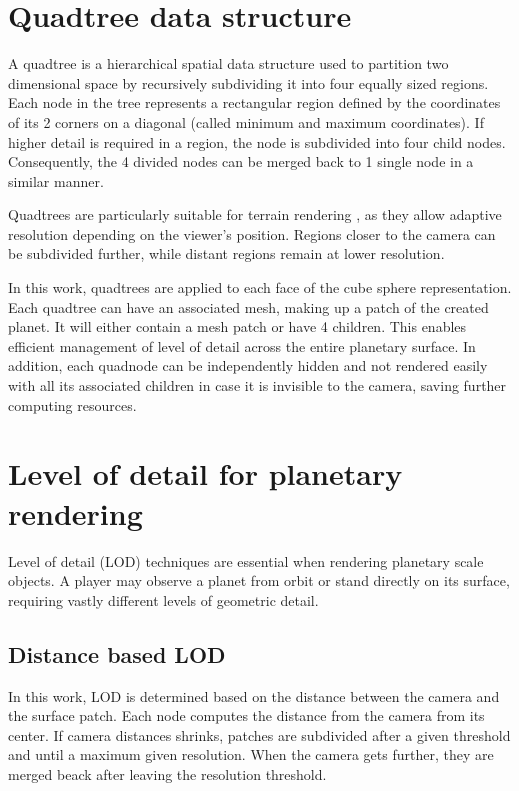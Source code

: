 \documentclass[12pt]{report}
\begin{document}
\section{Quadtree data structure}

A quadtree is a hierarchical spatial data structure \cite{wu2010, zechmann2025} used to partition two dimensional space by recursively subdividing it into four equally sized regions. Each node in the tree represents a rectangular region defined by the coordinates of its 2 corners on a diagonal (called minimum and maximum coordinates). If higher detail is required in a region, the node is subdivided into four child nodes. Consequently, the 4 divided nodes can be merged back to 1 single node in a similar manner.

Quadtrees are particularly suitable for terrain rendering \cite{wu2010,deaconu2021, zechmann2025}, as they allow adaptive resolution depending on the viewer's position. Regions closer to the camera can be subdivided further, while distant regions remain at lower resolution.

In this work, quadtrees are applied to each face of the cube sphere representation. Each quadtree can have an associated mesh, making up a patch of the created planet. It will either contain a mesh patch or have 4 children. This enables efficient management of level of detail across the entire planetary surface. In addition, each quadnode can be independently hidden and not rendered easily with all its associated children in case it is invisible to the camera, saving further computing resources.

\section{Level of detail for planetary rendering}

Level of detail (LOD) techniques are essential when rendering planetary scale objects. A player may observe a planet from orbit or stand directly on its surface, requiring vastly different levels of geometric detail.

\subsection{Distance based LOD}

In this work, LOD is determined based on the distance between the camera and the surface patch. Each node computes the distance from the camera from its center. If camera distances shrinks, patches are subdivided after a given threshold and until a maximum given resolution. When the camera gets further, they are merged beack after leaving the resolution threshold. 
\end{document}
